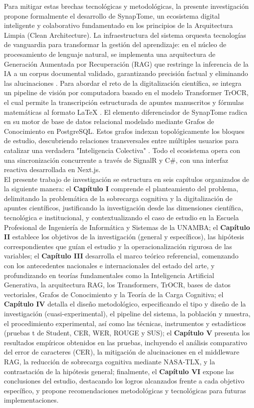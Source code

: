 Para mitigar estas brechas tecnológicas y metodológicas, la presente investigación propone formalmente el desarrollo de SynapTome, un ecosistema digital inteligente y colaborativo fundamentado en los principios de la Arquitectura Limpia (Clean Architecture). La infraestructura del sistema orquesta tecnologías de vanguardia para transformar la gestión del aprendizaje: en el núcleo de procesamiento de lenguaje natural, se implementa una arquitectura de Generación Aumentada por Recuperación (RAG) que restringe la inferencia de la IA a un corpus documental validado, garantizando precisión factual y eliminando las alucinaciones \parencite{Ning2025}. Para abordar el reto de la digitalización científica, se integra un pipeline de visión por computadora basado en el modelo Transformer TrOCR, el cual permite la transcripción estructurada de apuntes manuscritos y fórmulas matemáticas al formato LaTeX \parencite{KardanMoghaddam2025}. El elemento diferenciador de SynapTome radica en su motor de base de datos relacional modelado mediante Grafos de Conocimiento en PostgreSQL. Estos grafos indexan topológicamente los bloques de estudio, descubriendo relaciones transversales entre múltiples usuarios para catalizar una verdadera "Inteligencia Colectiva" \parencite{Obionwu2022}. Todo el ecosistema opera con una sincronización concurrente a través de SignalR y C\#, con una interfaz reactiva desarrollada en Next.js.\\

El presente trabajo de investigación se estructura en seis capítulos organizados de la siguiente manera: el \textbf{Capítulo I} comprende el planteamiento del problema, delimitando la problemática de la sobrecarga cognitiva y la digitalización de apuntes científicos, justificando la investigación desde las dimensiones científica, tecnológica e institucional, y contextualizando el caso de estudio en la Escuela Profesional de Ingeniería de Informática y Sistemas de la UNAMBA; el \textbf{Capítulo II} establece los objetivos de la investigación (general y específicos), las hipótesis correspondientes que guían el estudio y la operacionalización rigurosa de las variables; el \textbf{Capítulo III} desarrolla el marco teórico referencial, comenzando con los antecedentes nacionales e internacionales del estado del arte, y profundizando en teorías fundamentales como la Inteligencia Artificial Generativa, la arquitectura RAG, los Transformers, TrOCR, bases de datos vectoriales, Grafos de Conocimiento y la Teoría de la Carga Cognitiva; el \textbf{Capítulo IV} detalla el diseño metodológico, especificando el tipo y diseño de la investigación (cuasi-experimental), el pipeline del sistema, la población y muestra, el procedimiento experimental, así como las técnicas, instrumentos y estadísticos (pruebas t de Student, CER, WER, ROUGE y SUS); el \textbf{Capítulo V} presenta los resultados empíricos obtenidos en las pruebas, incluyendo el análisis comparativo del error de caracteres (CER), la mitigación de alucinaciones en el middleware RAG, la reducción de sobrecarga cognitiva mediante NASA-TLX, y la contrastación de la hipótesis general; finalmente, el \textbf{Capítulo VI} expone las conclusiones del estudio, destacando los logros alcanzados frente a cada objetivo específico, y propone recomendaciones metodológicas y tecnológicas para futuras implementaciones.